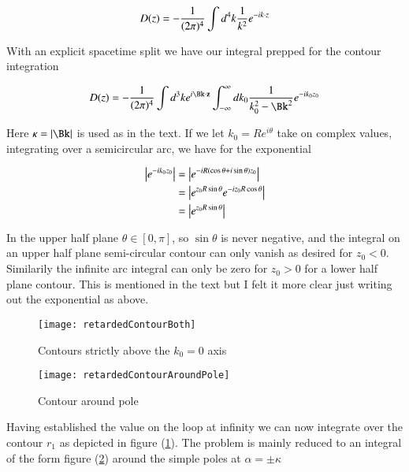 \begin{align}\label{eqn:jacksonRet:boo8}
D(z) = -\frac{1}{(2\pi)^4} \int d^4 k \frac{1}{k^2} e^{-i k \cdot z} 
\end{align}

With an explicit spacetime split we have our integral prepped for the contour integration

\begin{align}\label{eqn:jacksonRet:boo9}
D(z) = -\inv{(2\pi)^4} \int d^3 k e^{i \Bk \cdot \Bz} \int_{-\infty}^\infty dk_0 \inv{k_0^2 - \Bk^2} e^{-i k_0 z_0} 
\end{align}

Here $\kappa = \Abs{\Bk}$ is used as in the text.  If we let $k_0 = R e^{i\theta}$ take on complex values, integrating over a semicircular arc, we have for the exponential 

\begin{align*}
\left\lvert{e^{-i k_0 z_0}}\right\rvert
&= \left\lvert{e^{-i R (\cos\theta + i \sin\theta) z_0} }\right\rvert \\
&= \left\lvert{e^{ z_0 R \sin\theta} e^{ -i z_0 R \cos\theta } }\right\rvert \\
&= \left\lvert{e^{ z_0 R \sin\theta} }\right\rvert
\end{align*}

In the upper half plane $\theta \in [0,\pi]$, so $\sin\theta$ is never negative, and the integral on an upper half plane semi-circular contour can only vanish as desired for $z_0 < 0$.  Similarily the infinite arc integral can only be zero for $z_0 > 0$ for a lower half plane contour.  This is mentioned in the text but I felt it more clear just writing out the exponential as above.

\begin{figure}[htp]
\centering
\texttt{[image: retardedContourBoth]}
\caption{Contours strictly above the $k_0 = 0$ axis}\label{fig:jacksonRet:retardedContourBoth}
\end{figure}

\begin{figure}[htp]
\centering
\texttt{[image: retardedContourAroundPole]}
\caption{Contour around pole}\label{fig:jacksonRet:retardedContourAroundPole}
\end{figure}

Having established the value on the loop at infinity we can now integrate over the contour $r_1$ as depicted in figure (\ref{fig:jacksonRet:retardedContourBoth}).  The problem is mainly reduced to an integral of the form figure (\ref{fig:jacksonRet:retardedContourAroundPole}) around the simple poles at $\alpha = \pm \kappa$

